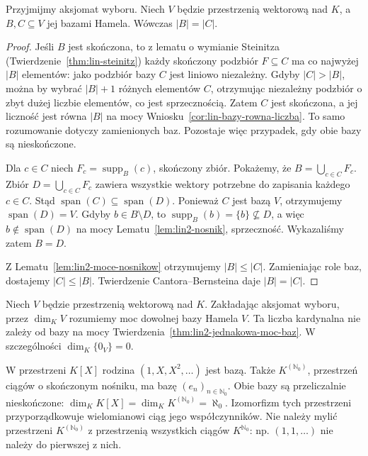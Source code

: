 \begin{twierdzenie}
\label{thm:lin2-jednakowa-moc-baz}
Przyjmijmy aksjomat wyboru.
Niech \(V\) będzie przestrzenią wektorową nad \(K\),
a \(B,C\subseteq V\) jej bazami Hamela.
Wówczas \(|B|=|C|\).
\end{twierdzenie}
\begin{proof}
Jeśli \(B\) jest skończona, to
z lematu o wymianie Steinitza
(Twierdzenie~\ref{thm:lin-steinitz})
każdy skończony podzbiór \(F\subseteq C\)
ma co najwyżej \(|B|\) elementów:
jako podzbiór bazy \(C\) jest liniowo niezależny.
Gdyby \(|C|>|B|\), można by wybrać
\(|B|+1\) różnych elementów \(C\),
otrzymując niezależny podzbiór
o zbyt dużej liczbie elementów, co jest sprzecznością.
Zatem \(C\) jest skończona, a jej liczność
jest równa \(|B|\) na mocy
Wniosku~\ref{cor:lin-bazy-rowna-liczba}.
To samo rozumowanie dotyczy zamienionych baz.
Pozostaje więc przypadek, gdy obie bazy są nieskończone.

Dla \(c\in C\) niech
\(F_c=\operatorname{supp}_B(c)\), skończony zbiór.
Pokażemy, że \(B=\bigcup_{c\in C}F_c\).
Zbiór \(D=\bigcup_{c\in C}F_c\) zawiera
wszystkie wektory potrzebne do zapisania
każdego \(c\in C\).
Stąd
\(\operatorname{span}(C)\subseteq\operatorname{span}(D)\).
Ponieważ \(C\) jest bazą \(V\),
otrzymujemy \(\operatorname{span}(D)=V\).
Gdyby \(b\in B\setminus D\), to
\(\operatorname{supp}_B(b)=\{b\}\not\subseteq D\),
a więc \(b\notin\operatorname{span}(D)\)
na mocy Lematu~\ref{lem:lin2-nosnik}, sprzeczność.
Wykazaliśmy zatem \(B=D\).

Z Lematu~\ref{lem:lin2-moce-nosnikow} otrzymujemy
\(|B|\leq|C|\).
Zamieniając role baz, dostajemy \(|C|\leq|B|\).
Twierdzenie Cantora--Bernsteina daje \(|B|=|C|\).
\end{proof}

\begin{definicja}
\label{def:lin2-wymiar}
Niech \(V\) będzie przestrzenią wektorową nad \(K\).
Zakładając aksjomat wyboru, przez
\(\dim_K V\) rozumiemy moc dowolnej bazy Hamela \(V\).
Ta liczba kardynalna nie zależy od bazy
na mocy Twierdzenia~\ref{thm:lin2-jednakowa-moc-baz}.
W szczególności \(\dim_K\{0_V\}=0\).
\end{definicja}

\begin{przyklad}
\label{prz:lin2-przeliczalna-baza}
W przestrzeni \(K[X]\) rodzina
\((1,X,X^2,\ldots)\) jest bazą.
Także \(K^{(\mathbb N_0)}\), przestrzeń ciągów
o skończonym nośniku, ma bazę \((e_n)_{n\in\mathbb N_0}\).
Obie bazy są przeliczalnie nieskończone:
\(\dim_KK[X]=\dim_KK^{(\mathbb N_0)}=\aleph_0\).
Izomorfizm tych przestrzeni przyporządkowuje
wielomianowi ciąg jego współczynników.
Nie należy mylić przestrzeni \(K^{(\mathbb N_0)}\)
z przestrzenią wszystkich ciągów \(K^{\mathbb N_0}\):
np. \((1,1,\ldots)\) nie należy do pierwszej z nich.
\end{przyklad}

